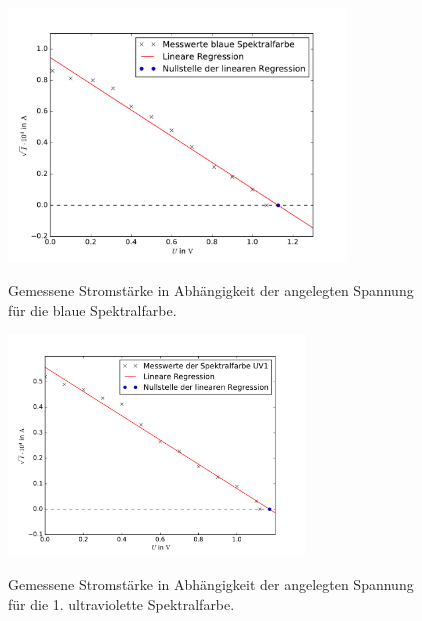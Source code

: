 \begin{figure}
  \centering
  \includegraphics[width = 0.8\textwidth]{Pics/blaue_Spektrallinie.pdf}\\[0cm]
  \caption{Gemessene Stromstärke in Abhängigkeit der angelegten Spannung für die
           blaue Spektralfarbe.}
  \label{fig:Blau}
\end{figure}

\newpage



\begin{figure}
  \centering
  \includegraphics[width = 0.7\textwidth]{Pics/UV1_Spektrallinie.pdf}\\[0cm]
  \caption{Gemessene Stromstärke in Abhängigkeit der angelegten Spannung für die
           1. ultraviolette Spektralfarbe.}
  \label{fig:UV1}
\end{figure}

\newpage



